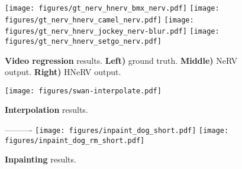 \documentclass[10pt,twocolumn,letterpaper]{article}
\begin{document}
\begin{figure*}[h!]
    \centering    
    \texttt{[image: figures/gt\_nerv\_hnerv\_bmx\_nerv.pdf]}
    \texttt{[image: figures/gt\_nerv\_hnerv\_camel\_nerv.pdf]}
    \texttt{[image: figures/gt\_nerv\_hnerv\_jockey\_nerv-blur.pdf]}
    \texttt{[image: figures/gt\_nerv\_hnerv\_setgo\_nerv.pdf]}
    \caption{\textbf{Video regression} results. 
    \textbf{Left)} ground truth.
    \textbf{Middle)} NeRV output.
    \textbf{Right)} HNeRV output.}
    \label{append-fig:regression}
\end{figure*}


\begin{figure*}[h!]
    \centering
    \texttt{[image: figures/swan-interpolate.pdf]}
    \caption{\textbf{Interpolation} results.}
    \label{append-fig:interpolate}
\end{figure*}

\begin{figure*}[h!]
    \centering    ----------
    \texttt{[image: figures/inpaint\_dog\_short.pdf]}
    \texttt{[image: figures/inpaint\_dog\_rm\_short.pdf]}  
    \caption{\textbf{Inpainting} results.}
    \label{append-fig:inpaint}
\end{figure*}
\end{document}
